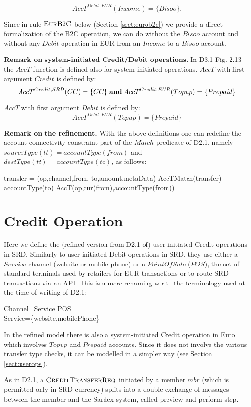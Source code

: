 \[AccT^{Debit,EUR}(Income) =\{Bisoo\}.\] 

Since in rule $\hbox{\sc EurB2C}$ below (Section \ref{sect:eurob2c}) we provide a direct formalization of the B2C operation, we can do without the $Bisoo$ account and without any $Debit$ operation in EUR from an $Income$ to a $Bisoo$ account.

{\bf Remark on system-initiated Credit/Debit operations.} In D3.1 Fig. 2.13 the $AccT$ function is defined also for system-initiated operations. $AccT$ with first argument $Credit$ is defined by:
\[AccT^{Credit,SRD}(CC)=\{CC\} \mathrel{\mathbf{and}} AccT^{Credit,EUR}(Topup)=\{Prepaid\} \]

$AccT$ with first argument $Debit$ is defined by:
\[AccT^{Debit,EUR}(Topup)=\{Prepaid\}\]

{\bf Remark on the refinement.} With the above definitions one can redefine the account connectivity constraint part of the $Match$ predicate of D2.1, namely $sourceType(tt)=accountType(from)$ and $destType(tt)=accountType(to)$, as follows:

\begin{asm}
\LET transfer = (op,channel,from, to,amount,metaData) \+
AccTMatch(transfer) \IFF ~~   accountType(to) \in AccT(op,cur(from),accountType(from))
\end{asm}

\section{Credit Operation} 
\label{sect:creditops}

Here we define the (refined version from D2.1 of) user-initiated Credit operations in SRD. Similarly to user-initiated Debit operations in SRD, they use either a $Service$ channel (website or mobile phone) or a $PointOfSale$ ($POS$), the set of standard terminals used by retailers for EUR transactions or to route SRD transactions via an API. This is a mere renaming w.r.t.\ the terminology used at the time of writing of D2.1:
\begin{asm}
Channel=Service \cup POS \\
Service=\{website,mobilePhone\}
\end{asm}

In the refined model there is also a system-initiated Credit operation in Euro which involves $Topup$ and $Prepaid$ accounts. Since it does not involve the various transfer type checks, it can be modelled in a simpler way (see Section \ref{sect:userops}).

As in D2.1, a $\hbox{\sc CreditTransferReq}$ initiated by a member $mbr$ (which is permitted only in SRD currency) splits into a double exchange of messages between the member and the Sardex system, called preview and perform step.

